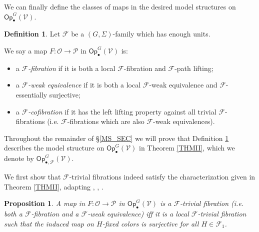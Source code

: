 \documentclass[a4paper,10pt
,draft
]{article}%
\numberwithin{equation}{section}
\numberwithin{figure}{section}
\newtheorem{proposition}[equation]{Proposition}%
\theoremstyle{definition} %
\newtheorem{definition}[equation]{Definition}%
\newcommand{\F}{\ensuremath{\mathcal F}}
\newcommand{\V}{\ensuremath{\mathcal V}}
\renewcommand{\O}{\ensuremath{\mathcal O}}
\renewcommand{\P}{\ensuremath{\mathcal P}}
\newcommand{\1}{\ensuremath{\mathbbm 1}}%
\begin{document}
We can finally define the classes of maps in the desired model structures on $\mathsf{Op}^G_\bullet(\V)$.



\begin{definition}\label{MODEL_DEFN}
Let $\F$ be a $(G, \Sigma)$-family which has enough units.

We say a map $F: \O \to \P$ in $\mathsf{Op}^G_\bullet(\V)$ is:
\begin{itemize}
	\item a {\em $\F$-fibration} if it is both a local $\F$-fibration and $\F$-path lifting;
	\item a {\em $\F$-weak equivalence} if it is both a local $\F$-weak equivalence and $\F$-essentially surjective;
	\item a \textit{$\F$-cofibration} if it has the left lifting property against all trivial $\F$-fibrations (i.e. $\F$-fibrations which are also $\F$-weak equivalences).
\end{itemize}
\end{definition}


Throughout the remainder of \S \ref{MS_SEC}
we will prove that 
Definition \ref{MODEL_DEFN} describes the model structure on 
$\mathsf{Op}^G_\bullet(\V)$
in Theorem \ref{THMII},
which we denote by
$\mathsf{Op}^G_{\bullet, \F}(\V)$.



We first show that $\F$-trivial fibrations
indeed satisfy the characterization given in Theorem \ref{THMII},
adapting \cite[4.8]{Cav}, \cite[2.3]{BM13}, \cite[1.18]{CM13b}.

\begin{proposition}\label{FTRIVCHAR PROP}
A map in $F: \O \to \P$ in $\mathsf{Op}^G_\bullet(\V)$ is 
a $\F$-trivial fibration (i.e. both a $\F$-fibration and a $\F$-weak equivalence) 
iff it is a local $\F$-trivial fibration
such that the induced map on $H$-fixed colors is surjective
for all $H \in \F_1$.
\end{proposition}
\end{document}
